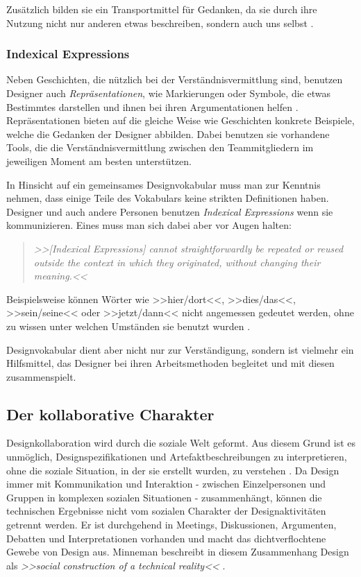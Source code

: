 \medskip Zusätzlich bilden sie ein Transportmittel für Gedanken, da sie durch ihre Nutzung nicht nur anderen etwas beschreiben, sondern auch uns selbst \citep{Norman:1994}.

\subsubsection{Indexical Expressions} 
Neben Geschichten, die nützlich bei der Verständnisvermittlung sind, benutzen Designer auch \emph{Repräsentationen}, wie Markierungen oder Symbole, die etwas Bestimmtes darstellen und ihnen bei ihren Argumentationen helfen \citep{Norman:1994}. Repräsentationen bieten auf die gleiche Weise wie Geschichten konkrete Beispiele, welche die Gedanken der Designer abbilden. Dabei benutzen sie vorhandene Tools, die die Verständnisvermittlung zwischen den Teammitgliedern im jeweiligen Moment am besten unterstützen.

\medskip In Hinsicht auf ein gemeinsames Designvokabular muss man zur Kenntnis nehmen, dass einige Teile des Vokabulars keine strikten Definitionen haben. Designer und auch andere Personen benutzen \emph{Indexical Expressions} wenn sie kommunizieren. Eines muss man sich dabei aber vor Augen halten:

\begin{quote}
	\textsl{>>[Indexical Expressions] cannot straightforwardly be repeated or reused outside the context in which they originated, without changing their meaning.<<}
\begin{flushright}\citep{Kristoffersen:1999}\end{flushright}
\end{quote}

Beispielsweise  können Wörter wie >>hier/dort<<, >>dies/das<<, >>sein/seine<< oder >>jetzt/dann<< nicht angemessen gedeutet werden, ohne zu wissen unter welchen Umständen sie benutzt wurden \citep{Larsson:2003}.

\medskip Designvokabular dient aber nicht nur zur Verständigung, sondern ist vielmehr ein Hilfsmittel, das Designer bei ihren Arbeitsmethoden begleitet und mit diesen zusammenspielt.

\subsection{Der kollaborative Charakter} 
Designkollaboration wird durch die soziale Welt geformt. Aus diesem Grund ist es unmöglich, Designspezifikationen und Artefaktbeschreibungen zu interpretieren, ohne die soziale Situation, in der sie erstellt wurden, zu verstehen \citep{Brown:2002}. Da Design immer mit Kommunikation und Interaktion - zwischen Einzelpersonen und Gruppen in komplexen sozialen Situationen - zusammenhängt, können die technischen Ergebnisse nicht vom sozialen Charakter der Designaktivitäten getrennt werden. Er ist durchgehend in Meetings, Diskussionen, Argumenten, Debatten und Interpretationen vorhanden und macht das dichtverflochtene Gewebe von Design aus. Minneman beschreibt in diesem Zusammenhang Design als \emph{>>social construction of a technical reality<<} \citep{Minneman:1991}.

